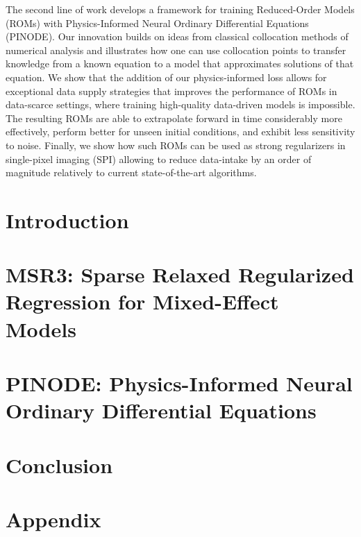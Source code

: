 \documentclass[12pt,a4paper]{book}
\numberwithin{equation}{section} %
\numberwithin{figure}{section} %
\numberwithin{table}{section} %
\begin{document}
The second line of work develops a framework for training Reduced-Order Models (ROMs) with Physics-Informed Neural Ordinary Differential Equations (PINODE). Our innovation builds on ideas from classical collocation methods of numerical analysis and illustrates how one can use collocation points to transfer knowledge from a known equation to a model that approximates solutions of that equation. We show that the addition of our physics-informed loss allows for exceptional data supply strategies that improves the performance of ROMs in data-scarce settings, where training high-quality data-driven models is impossible. The resulting ROMs are able to extrapolate forward in time considerably more effectively,  perform better for unseen initial conditions, and exhibit less sensitivity to noise. Finally, we show how such ROMs can be used as strong regularizers in single-pixel imaging (SPI) allowing to reduce data-intake by an order of magnitude relatively to current state-of-the-art algorithms.

\tableofcontents

\listoftodos

\chapter{Introduction}


\chapter{MSR3: Sparse Relaxed Regularized Regression for Mixed-Effect Models}
\label{ch:msr3}


\chapter{PINODE: Physics-Informed Neural Ordinary Differential Equations}
\label{ch:pinode}




\chapter{Conclusion}





\clearpage

\appendix
\chapter{Appendix}
\end{document}
